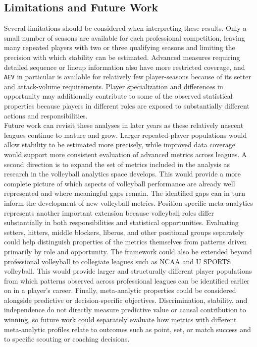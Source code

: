 \documentclass[10pt]{article}
\begin{document}
\subsection{Limitations and Future Work}

Several limitations should be considered when interpreting these results.
Only a small number of seasons are available for each professional competition, leaving many repeated players with two or three qualifying seasons and limiting the precision with which stability can be estimated.
Advanced measures requiring detailed sequence or lineup information also have more restricted coverage, and \texttt{AEV} in particular is available for relatively few player-seasons because of its setter and attack-volume requirements.
Player specialization and differences in opportunity may additionally contribute to some of the observed statistical properties because players in different roles are exposed to substantially different actions and responsibilities. \\

Future work can revisit these analyses in later years as these relatively nascent leagues continue to mature and grow.
Larger repeated-player populations would allow stability to be estimated more precisely, while improved data coverage would support more consistent evaluation of advanced metrics across leagues.
A second direction is to expand the set of metrics included in the analysis as research in the volleyball analytics space develops.
This would provide a more complete picture of which aspects of volleyball performance are already well represented and where meaningful gaps remain.
The identified gaps can in turn inform the development of new volleyball metrics.
Position-specific meta-analytics represents another important extension because volleyball roles differ substantially in both responsibilities and statistical opportunities.
Evaluating setters, hitters, middle blockers, liberos, and other positional groups separately could help distinguish properties of the metrics themselves from patterns driven primarily by role and opportunity.
The framework could also be extended beyond professional volleyball to collegiate leagues such as NCAA and U SPORTS volleyball.
This would provide larger and structurally different player populations from which patterns observed across professional leagues can be identified earlier on in a player's career.
Finally, meta-analytic properties could be considered alongside predictive or decision-specific objectives.
Discrimination, stability, and independence do not directly measure predictive value or causal contribution to winning, so future work could separately evaluate how metrics with different meta-analytic profiles relate to outcomes such as point, set, or match success and to specific scouting or coaching decisions.
\end{document}

